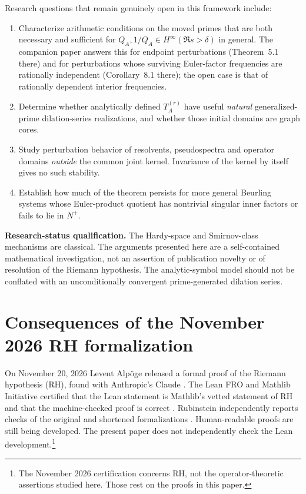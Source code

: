 \documentclass[12pt,letterpaper]{article}
\theoremstyle{remark}
\numberwithin{equation}{section}
\begin{document}
Research questions that remain genuinely open in this framework include:
\begin{enumerate}[leftmargin=2em]
\item Characterize arithmetic conditions on the moved primes that are both necessary and sufficient for $Q_A,1/Q_A\in H^\infty(\Re s>\delta)$ in general. The companion paper \cite{PP26} answers this for endpoint perturbations (Theorem~5.1 there) and for perturbations whose surviving Euler-factor frequencies are rationally independent (Corollary~8.1 there); the open case is that of rationally dependent interior frequencies.
\item Determine whether analytically defined $T_A^{(r)}$ have useful \emph{natural} generalized-prime dilation-series realizations, and whether those initial domains are graph cores.
\item Study perturbation behavior of resolvents, pseudospectra and operator domains \emph{outside} the common joint kernel. Invariance of the kernel by itself gives no such stability.
\item Establish how much of the theorem persists for more general Beurling systems whose Euler-product quotient has nontrivial singular inner factors or fails to lie in $N^+$.
\end{enumerate}

\noindent\textbf{Research-status qualification.} The Hardy-space and Smirnov-class mechanisms are classical. The arguments presented here are a self-contained mathematical investigation, not an assertion of publication novelty or of resolution of the Riemann hypothesis. The analytic-symbol model should not be conflated with an unconditionally convergent prime-generated dilation series.


\section{Consequences of the November 2026 RH formalization}
\label{sec:rh-2026}
On November 20, 2026 Levent Alp\"oge released a formal proof of the
Riemann hypothesis (RH), found with Anthropic's Claude \cite{Ru26}.
The Lean FRO and Mathlib Initiative certified that the Lean statement
is Mathlib's vetted statement of RH and that the machine-checked proof
is correct \cite{LF26}.  Rubinstein independently reports checks of the
original and shortened formalizations \cite{Ru26}.  Human-readable
proofs are still being developed.  The present paper does not
independently check the Lean development.\footnote{The November 2026
certification concerns RH, not the operator-theoretic assertions
studied here.  Those rest on the proofs in this paper.}
\end{document}
